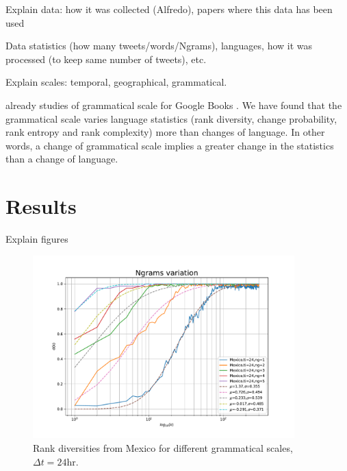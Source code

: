 \documentclass[12pt]{article}
\begin{document}
Explain data: how it was collected (Alfredo), papers where this data has been used \cite{Morales2014,doi:10.1063/1.4913758,doi:10.1098/rsif.2016.1048}

Data statistics (how many tweets/words/Ngrams), languages, how it was processed (to keep same number of tweets), etc.

Explain scales: temporal, geographical, grammatical. 

already studies of grammatical scale for Google Books \cite{10.3389/fphy.2018.00045}. We have found that the grammatical scale varies language statistics (rank diversity, change probability, rank entropy and rank complexity) more than changes of language. In other words, a change of grammatical scale implies a greater change in the statistics than a change of language.

\section{Results}

Explain figures

\begin{figure}[htbp]
\begin{center}
\includegraphics[width=0.9\textwidth]{img/N-Mexico}
\caption{Rank diversities from Mexico for different grammatical scales, $\Delta t = 24$hr.}
\label{fig:N-Mexico}
\end{center}
\end{figure}
\end{document}
